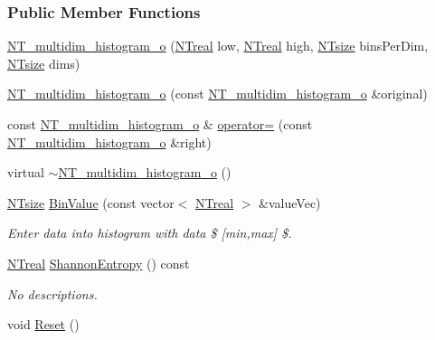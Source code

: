 \subsubsection*{Public Member Functions}
\begin{DoxyCompactItemize}
\item 
\hyperlink{class_n_t__multidim__histogram__o_a38dbea9a342e4f5928ee7a9bbffddd2d}{NT\_\-multidim\_\-histogram\_\-o} (\hyperlink{nt__types_8h_a814a97893e9deb1eedcc7604529ba80d}{NTreal} low, \hyperlink{nt__types_8h_a814a97893e9deb1eedcc7604529ba80d}{NTreal} high, \hyperlink{nt__types_8h_a06c124f2e4469769b58230253ce0560b}{NTsize} binsPerDim, \hyperlink{nt__types_8h_a06c124f2e4469769b58230253ce0560b}{NTsize} dims)
\item 
\hyperlink{class_n_t__multidim__histogram__o_a64f1792574837cf0c60d18d25f64659d}{NT\_\-multidim\_\-histogram\_\-o} (const \hyperlink{class_n_t__multidim__histogram__o}{NT\_\-multidim\_\-histogram\_\-o} \&original)
\item 
const \hyperlink{class_n_t__multidim__histogram__o}{NT\_\-multidim\_\-histogram\_\-o} \& \hyperlink{class_n_t__multidim__histogram__o_aed53e86f8ec085971e73c97156a01038}{operator=} (const \hyperlink{class_n_t__multidim__histogram__o}{NT\_\-multidim\_\-histogram\_\-o} \&right)
\item 
virtual \hyperlink{class_n_t__multidim__histogram__o_aa6b59af5c10cb03b88e7422c2b546a03}{$\sim$NT\_\-multidim\_\-histogram\_\-o} ()
\item 
\hyperlink{nt__types_8h_a06c124f2e4469769b58230253ce0560b}{NTsize} \hyperlink{class_n_t__multidim__histogram__o_a4e799a71f77125700c32a731b6778465}{BinValue} (const vector$<$ \hyperlink{nt__types_8h_a814a97893e9deb1eedcc7604529ba80d}{NTreal} $>$ \&valueVec)
\begin{DoxyCompactList}\small\item\em Enter data into histogram with data \$ \mbox{[}min,max\mbox{]} \$. \item\end{DoxyCompactList}\item 
\hyperlink{nt__types_8h_a814a97893e9deb1eedcc7604529ba80d}{NTreal} \hyperlink{class_n_t__multidim__histogram__o_a776b8ed135863ea9b19635f913a19991}{ShannonEntropy} () const 
\begin{DoxyCompactList}\small\item\em No descriptions. \item\end{DoxyCompactList}\item 
void \hyperlink{class_n_t__multidim__histogram__o_ad6bf72ceb582a6f8c3ca413145370072}{Reset} ()

\end{DoxyCompactItemize}

